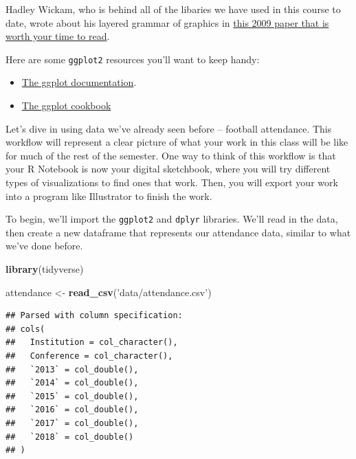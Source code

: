\documentclass[]{book}
\newenvironment{Shaded}{\begin{snugshade}}{\end{snugshade}}
\newcommand{\KeywordTok}[1]{\textcolor[rgb]{0.13,0.29,0.53}{\textbf{#1}}}
\newcommand{\StringTok}[1]{\textcolor[rgb]{0.31,0.60,0.02}{#1}}
\newcommand{\NormalTok}[1]{#1}
\providecommand{\tightlist}{%
  \setlength{\itemsep}{0pt}\setlength{\parskip}{0pt}}
\begin{document}
Hadley Wickam, who is behind all of the libaries we have used in this
course to date, wrote about his layered grammar of graphics in
\href{http://byrneslab.net/classes/biol607/readings/wickham_layered-grammar.pdf}{this
2009 paper that is worth your time to read}.

Here are some \texttt{ggplot2} resources you'll want to keep handy:

\begin{itemize}
\tightlist
\item
  \href{http://ggplot2.tidyverse.org/reference/index.html}{The ggplot
  documentation}.
\item
  \href{http://www.cookbook-r.com/Graphs/}{The ggplot cookbook}
\end{itemize}

Let's dive in using data we've already seen before -- football
attendance. This workflow will represent a clear picture of what your
work in this class will be like for much of the rest of the semester.
One way to think of this workflow is that your R Notebook is now your
digital sketchbook, where you will try different types of visualizations
to find ones that work. Then, you will export your work into a program
like Illustrator to finish the work.

To begin, we'll import the \texttt{ggplot2} and \texttt{dplyr}
libraries. We'll read in the data, then create a new dataframe that
represents our attendance data, similar to what we've done before.

\begin{Shaded}
\begin{Highlighting}[]
\KeywordTok{library}\NormalTok{(tidyverse)}
\end{Highlighting}
\end{Shaded}

\begin{Shaded}
\begin{Highlighting}[]
\NormalTok{attendance <-}\StringTok{ }\KeywordTok{read_csv}\NormalTok{(}\StringTok{'data/attendance.csv'}\NormalTok{)}
\end{Highlighting}
\end{Shaded}

\begin{verbatim}
## Parsed with column specification:
## cols(
##   Institution = col_character(),
##   Conference = col_character(),
##   `2013` = col_double(),
##   `2014` = col_double(),
##   `2015` = col_double(),
##   `2016` = col_double(),
##   `2017` = col_double(),
##   `2018` = col_double()
## )
\end{verbatim}
\end{document}
